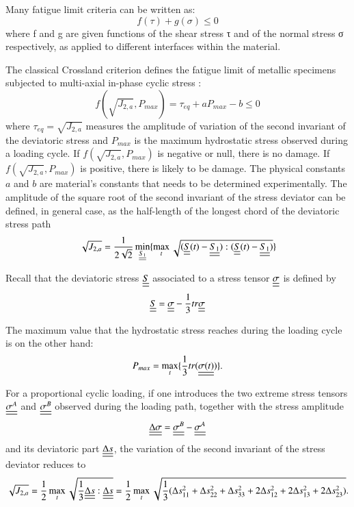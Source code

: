 \documentclass[3p,times,procedia,number]{elsarticle}
\begin{document}
Many fatigue limit criteria can be written as:
\begin{equation}
	f(\tau)+g(\sigma) \leqslant 0
\end{equation}
where f and g are given functions of the shear stress τ and of the normal stress σ respectively, as applied to different interfaces within the material.  

The classical Crossland criterion defines the fatigue limit of metallic specimens subjected to multi-axial in-phase cyclic stress\cite{Crossland} : \begin{equation}f(\sqrt{J_{2,a}},P_{max})=\tau_{eq}+aP_{max}-b\leqslant 0\end{equation}
where $\tau_{eq}=\sqrt{J_{2,a}}$ measures  the amplitude of variation of the second invariant of the deviatoric stress  and $P_{max}$ is the maximum hydrostatic stress observed during a loading cycle. If $f(\sqrt{J_{2,a}},P_{max})$ is negative or null, there is no damage. If $f(\sqrt{J_{2,a}},P_{max})$ is positive, there is likely to be damage. The physical constants $a$ and $b$ are material's constants that needs to be determined experimentally. The amplitude of the square root of the second invariant of the stress deviator can be defined, in general case, as the half-length of the longest chord of the deviatoric stress path\cite{Papadopoulos1997219}
\begin{equation}\sqrt{J_{2,a}}=\frac{1}{2\sqrt{2}}\min \limits_{\uline{\uline{S_1}}}\{\max \limits_{t}\sqrt{(\uline{\uline{S}}(t)-\uline{\uline{S_1}}):(\uline{\uline{S}}(t)-\uline{\uline{S_1}})}\}\end{equation}

Recall that the deviatoric stress $\uline{\uline{S}}$ associated to a stress tensor $\uline{\uline{\sigma}}$  is defined by
\begin{equation} \uline{\uline{S}}=\uline{\uline{\sigma}}-\frac{1}{3}tr\uline{\uline{\sigma}} 
\end{equation}

The maximum value that the hydrostatic stress reaches during the loading cycle is on the other hand:
\begin{equation}
	P_{max}=\max\limits_{t}\{\frac{1}{3}tr(\uline{\uline{\sigma(t)}})\}.
\end{equation}

For a proportional cyclic loading, if one introduces the two extreme stress tensors $\uline{\uline{\sigma^A}}$ and $\uline{\uline{\sigma^B}}$ observed during the loading path, together with the stress amplitude
\begin{equation}\uline{\uline{\Delta\sigma}}=\uline{\uline{\sigma^B}}-\uline{\uline{\sigma^A}}\end{equation}
and its deviatoric part $\uline{\uline{\Delta s}} $, the variation of
the second invariant of the stress deviator reduces to 
\begin{equation}\sqrt{J_{2,a}}=\frac{1}{2}\max\limits_{t}\sqrt{\frac{1}{3}\uline{\uline{\Delta s}}:\uline{\uline{\Delta s}}}=\frac{1}{2}\max\limits_{t}\sqrt{\frac{1}{3}(\Delta s_{11}^2+\Delta s_{22}^2+\Delta s_{33}^2+2\Delta s_{12}^2+2\Delta s_{13}^2+2\Delta s_{23}^2)}.\end{equation}
\end{document}
